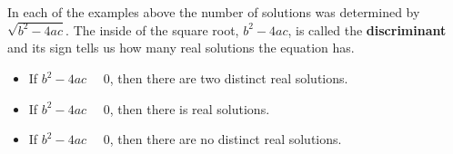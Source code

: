 \documentclass{ximera}
\begin{document}
In each of the examples above the number of solutions was determined by $\sqrt{b^2 - 4 a c}$.  The inside of the square root, $b^2 - 4 a c$, is called the \textbf{discriminant} and its sign tells us how many real solutions the equation has.


\begin{itemize}
\item If $b^2 - 4 a c$ \, \wordChoice{\choice[correct]{$>$}\choice{$=$}\choice{$<$}} \, $0$, then there are two distinct real solutions.
\item If $b^2 - 4 a c$ \, \wordChoice{\choice[correct]{$>$}\choice[correct]{$=$}\choice{$<$}} \, $0$, then there is real solutions.
\item If $b^2 - 4 a c$ \, \wordChoice{\choice[correct]{$>$}\choice{$=$}\choice[correct]{$<$}} \, $0$, then there are no distinct real solutions.

\end{itemize}
\end{document}

